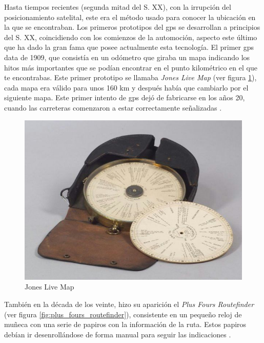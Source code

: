 Hasta tiempos recientes (segunda mitad del S. XX), con la irrupción del posicionamiento satelital, este era el método usado para conocer la ubicación en la que se encontraban.
Los primeros prototipos del gps se desarrollan a principios del S. XX, coincidiendo con los comienzos de la automoción, aspecto este último que ha dado la gran fama que posee actualmente esta tecnología.
El primer gps data de 1909, que consistía en un odómetro que giraba un mapa indicando los hitos más importantes que se podían encontrar en el punto kilométrico en el que te encontrabas.
Este primer prototipo se llamaba \textit{Jones Live Map} (ver figura \ref{fig:jones_live_map}), cada mapa era válido para unos 160 km y después había que cambiarlo por el siguiente mapa. Este primer intento de gps dejó de fabricarse en los años 20, cuando las carreteras comenzaron a estar correctamente señalizadas \cite{GPS12}.

\begin{figure}[h!btp]
\centering
\includegraphics[scale=0.5, fbox={\fboxrule} 4mm]{images/03-antecedentes/06-jones_live_map.png}
\caption{Jones Live Map}
\label{fig:jones_live_map}
\end{figure}

También en la década de los veinte, hizo su aparición el \textit{Plus Fours Routefinder} (ver figura \ref{fig:plus_fours_routefinder}), consistente en un pequeño reloj de muñeca con una serie de papiros con la información de la ruta. Estos papiros debían ir desenrollándose de forma manual para seguir las indicaciones \cite{Plus14}.

